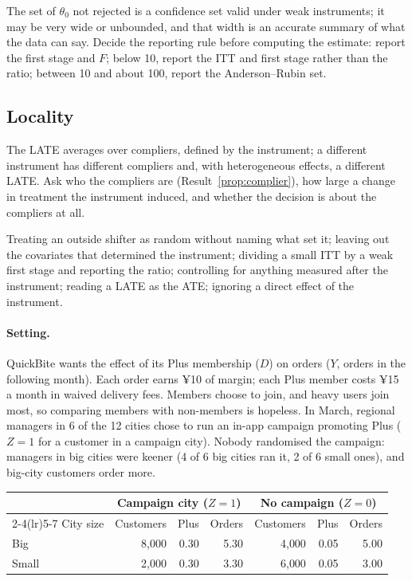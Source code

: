 \documentclass[11pt]{article}
\begin{document}
The set of $\theta_0$ not rejected is a confidence set valid under weak instruments; it may be very wide or unbounded, and that
width is an accurate summary of what the data can say. Decide the reporting rule before computing the estimate: report the first stage and $F$; below 10, report the ITT and first stage
rather than the ratio; between 10 and about 100, report the Anderson--Rubin set.

\subsection{Locality}

The LATE averages over compliers, defined by the instrument; a different instrument has different compliers and, with heterogeneous
effects, a different LATE. Ask who the compliers are (Result~\ref{prop:complier}), how large a change in treatment the instrument
induced, and whether the decision is about the compliers at all.

\begin{pitfall}[IV errors]
Treating an outside shifter as random without naming what set it; leaving out the covariates that determined the instrument;
dividing a small ITT by a weak first stage and reporting the ratio; controlling for anything measured after the instrument; reading a
LATE as the ATE; ignoring a direct effect of the instrument.
\end{pitfall}

\sectiontwo

\paragraph{Setting.} QuickBite wants the effect of its Plus membership ($D$) on orders ($Y$, orders in the following month).
Each order earns ¥10 of margin; each Plus member costs ¥15 a month in waived delivery fees. Members choose to join, and heavy
users join most, so comparing members with non-members is hopeless. In March, regional managers in 6 of the 12 cities chose
to run an in-app campaign promoting Plus ($Z = 1$ for a customer in a campaign city). Nobody randomised the campaign: managers
in big cities were keener (4 of 6 big cities ran it, 2 of 6 small ones), and big-city customers order more.

\begin{center}
\small
\begin{tabular}{lrrrrrr}
\toprule
& \multicolumn{3}{c}{Campaign city ($Z = 1$)} & \multicolumn{3}{c}{No campaign ($Z = 0$)} \\
\cmidrule(lr){2-4}\cmidrule(lr){5-7}
City size & Customers & Plus & Orders & Customers & Plus & Orders \\
\midrule
Big & 8{,}000 & 0.30 & 5.30 & 4{,}000 & 0.05 & 5.00 \\
Small & 2{,}000 & 0.30 & 3.30 & 6{,}000 & 0.05 & 3.00 \\
\bottomrule
\end{tabular}
\end{center}
\end{document}
